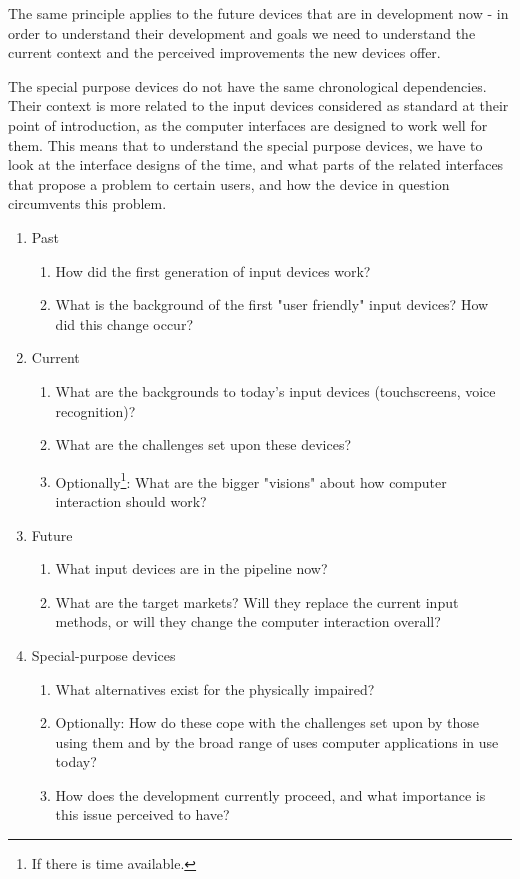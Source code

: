 \documentclass[a4paper,10pt]{article}
\begin{document}
The same principle applies to the future devices that are in development now - in order to understand their development and goals we need to understand the current context and the perceived improvements the new devices offer.

The special purpose devices do not have the same chronological dependencies. Their context is more related to the input devices considered as standard at their point of introduction, as the computer interfaces are designed to work well for them. This means that to understand the special purpose devices, we have to look at the interface designs of the time, and what parts of the related interfaces that propose a problem to certain users, and how the device in question circumvents this problem.

\begin{enumerate}
	\item
	Past
	\begin{enumerate}[I]
		\item How did the first generation of input devices work?
		\item What is the background of the first "user friendly" input devices? How did this change occur?
	\end{enumerate}

	\item
	Current
	\begin{enumerate}[I]
		\item What are the backgrounds to today’s input devices (touchscreens, voice recognition)?
		\item What are the challenges set upon these devices?
		\item Optionally\footnote{If there is time available.}: What are the bigger "visions" about how computer interaction should work?
	\end{enumerate}

	\item
	Future
	\begin{enumerate}[I]
		\item What input devices are in the pipeline now?
		\item What are the target markets? Will they replace the current input methods, or will they change the computer 	interaction overall?
	\end{enumerate}

	\item
	Special-purpose devices
	\begin{enumerate}[I]
		\item
		What alternatives exist for the physically impaired?
		\item
		Optionally: How do these cope with the challenges set upon by those using them and by the broad range of uses computer applications in use today?
		\item
		How does the development currently proceed, and what importance is this issue perceived to have?
	\end{enumerate}
\end{enumerate}
\end{document}

